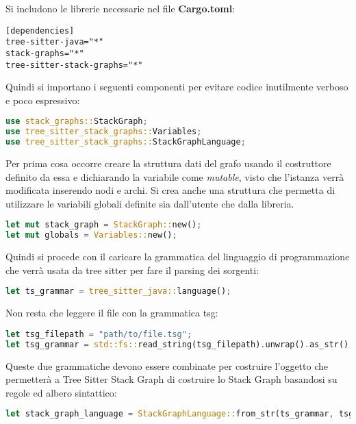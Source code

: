 Si includono le librerie necessarie nel file \textbf{Cargo.toml}:

\begin{lstlisting}
[dependencies]
tree-sitter-java="*"
stack-graphs="*"
tree-sitter-stack-graphs="*"
\end{lstlisting}

Quindi si importano i seguenti componenti per evitare codice inutilmente verboso e poco espressivo:
\begin{lstlisting}[language=Rust]
use stack_graphs::StackGraph;
use tree_sitter_stack_graphs::Variables; 
use tree_sitter_stack_graphs::StackGraphLanguage; 
\end{lstlisting}

Per prima cosa occorre creare la struttura dati del grafo usando il costruttore definito da essa e dichiarando la variabile come \emph{mutable}, visto che l'istanza verr\`a modificata inserendo nodi e archi.
Si crea anche una struttura che permetta di utilizzare le variabili globali definite sia dall'utente che dalla libreria.

\begin{lstlisting}[language=Rust]
let mut stack_graph = StackGraph::new();
let mut globals = Variables::new();
\end{lstlisting}

Quindi si procede con il caricare la grammatica del linguaggio di programmazione che verr\`a usata da tree sitter per fare il parsing dei sorgenti:

\begin{lstlisting}[language=Rust]
let ts_grammar = tree_sitter_java::language();
\end{lstlisting}

Non resta che leggere il file con la grammatica tsg:

\begin{lstlisting}[language=Rust]
let tsg_filepath = "path/to/file.tsg";
let tsg_grammar = std::fs::read_string(tsg_filepath).unwrap().as_str();
\end{lstlisting}

Queste due grammatiche devono essere combinate per costruire l'oggetto che permetter\`a a Tree Sitter Stack Graph di costruire lo Stack Graph basandosi su regole ed albero sintattico:

\begin{lstlisting}[language=Rust]
let stack_graph_language = StackGraphLanguage::from_str(ts_grammar, tsg_grammar).unwrap();
\end{lstlisting}

